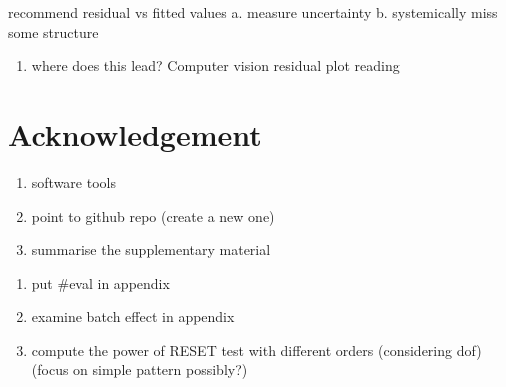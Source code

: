 \documentclass[]{interact}
\theoremstyle{plain}%
\theoremstyle{definition}
\theoremstyle{remark}
\providecommand{\tightlist}{%
  \setlength{\itemsep}{0pt}\setlength{\parskip}{0pt}}
\def\tightlist{}
\begin{document}
recommend residual vs fitted values a. measure uncertainty b.
systemically miss some structure

\begin{enumerate}
\def\labelenumi{\arabic{enumi}.}
\setcounter{enumi}{3}
\tightlist
\item
  where does this lead? Computer vision residual plot reading
\end{enumerate}

\hypertarget{acknowledgement}{%
\section{Acknowledgement}\label{acknowledgement}}

\begin{enumerate}
\def\labelenumi{\arabic{enumi}.}
\tightlist
\item
  software tools
\item
  point to github repo (create a new one)
\item
  summarise the supplementary material
\end{enumerate}

\newpage

\begin{enumerate}
\def\labelenumi{\arabic{enumi}.}
\tightlist
\item
  put \#eval in appendix
\item
  examine batch effect in appendix
\item
  compute the power of RESET test with different orders (considering
  dof) (focus on simple pattern possibly?)
\end{enumerate}



\end{document}
